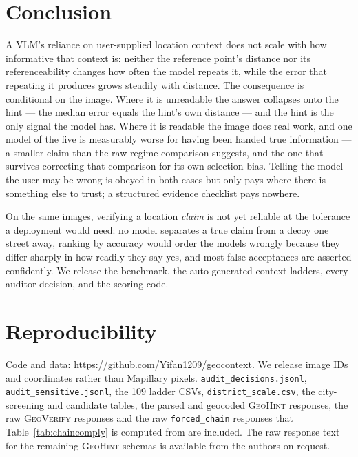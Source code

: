 \documentclass[10pt,a4paper]{article}
\begin{document}
\section{Conclusion}

A VLM's reliance on user-supplied location context does not scale with how
informative that context is: neither the reference point's distance nor its
referenceability changes how often the model repeats it, while the error that
repeating it produces grows steadily with distance. The consequence is
conditional on the image. Where it is unreadable the answer collapses onto the
hint --- the median error equals the hint's own distance --- and the hint is the
only signal the model has. Where it is readable the image does real work, and
one model of the five is measurably worse for having been handed true
information --- a smaller claim than the raw regime comparison suggests, and
the one that survives correcting that comparison for its own selection bias.
Telling the model the user may be wrong is obeyed in both cases but only pays
where there is something else to trust; a structured evidence checklist pays
nowhere.

On the same images, verifying a location \emph{claim} is not yet reliable at the
tolerance a deployment would need: no model separates a true claim from a decoy
one street away, ranking by accuracy would order the models wrongly because they
differ sharply in how readily they say yes, and most false acceptances are
asserted confidently. We release the benchmark, the auto-generated context
ladders, every auditor decision, and the scoring code.

\section*{Reproducibility}

Code and data: \url{https://github.com/Yifan1209/geocontext}. We release image IDs and coordinates rather
than Mapillary pixels. \texttt{audit\_decisions.jsonl},
\texttt{audit\_sensitive.jsonl}, the \num{109} ladder CSVs,
\texttt{district\_scale.csv}, the city-screening and candidate tables, the
parsed and geocoded \textsc{GeoHint}
responses, the raw \textsc{GeoVerify} responses and the raw
\texttt{forced\_chain} responses that Table~\ref{tab:chaincomply} is computed
from are included. The raw response text for the remaining \textsc{GeoHint}
schemas is available from the authors on request.
\end{document}
